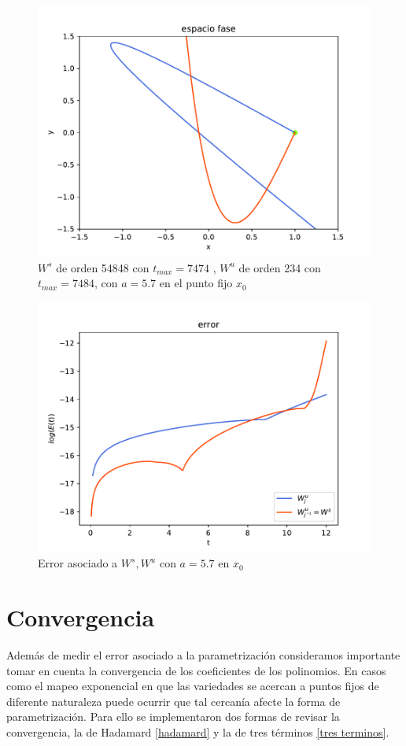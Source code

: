 \begin{figure}[H]
\centering
\includegraphics[scale=0.6]{jung57}
\caption{$W^{s}$ de orden 54848 con $t_{max}=7474$ , $W^{u}$ de orden 234 con $t_{max}=7484$, con $a=5.7$ en el punto fijo $x_{0}$}
\label{jung2}
\end{figure}


\begin{figure}[H]
\centering
\includegraphics[scale=0.6]{error_jung57}
\caption{Error asociado a $W^{s},W^{u}$ con $a=5.7$ en $x_{0}$}
\label{errorjung2}
\end{figure}


\section{Convergencia}
Además de medir el error asociado a la parametrización consideramos importante tomar en cuenta la convergencia de los coeficientes de los polinomios. En casos como el mapeo exponencial en que las variedades se acercan a puntos fijos de diferente naturaleza puede ocurrir que tal cercanía afecte la forma de parametrización. Para ello se implementaron dos formas de revisar la convergencia, la de Hadamard \ref{hadamard} y la de tres términos \ref{tres terminos}. \\

